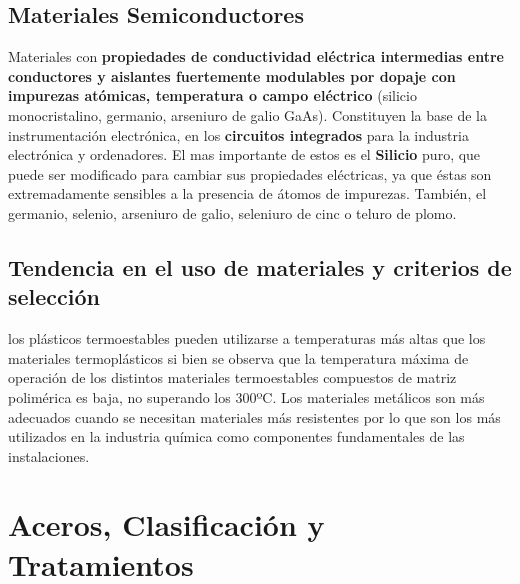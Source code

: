 \subsection{Materiales Semiconductores}
Materiales con \textbf{propiedades de conductividad eléctrica intermedias entre conductores y aislantes fuertemente modulables por dopaje con impurezas atómicas, temperatura o campo eléctrico} (silicio monocristalino, germanio, arseniuro de galio GaAs). Constituyen la base de la instrumentación electrónica, en los \textbf{circuitos integrados} para la industria electrónica y ordenadores. El mas importante de estos es el \textbf{Silicio} puro,
que puede ser modificado para cambiar sus propiedades eléctricas, ya que éstas son extremadamente sensibles a la presencia de átomos de impurezas. También, el germanio, selenio, arseniuro de galio, seleniuro de cinc o teluro de plomo.

\subsection{Tendencia en el uso de materiales y criterios de selección}
los plásticos termoestables pueden utilizarse a temperaturas más altas que los materiales termoplásticos si bien se observa que la temperatura máxima de operación de los distintos materiales termoestables compuestos de matriz polimérica es baja, no superando los 300ºC. Los materiales metálicos son más adecuados cuando se necesitan materiales más resistentes por lo que son los más utilizados en la industria química como componentes fundamentales de las instalaciones.
\section{Aceros, Clasificación y Tratamientos}
